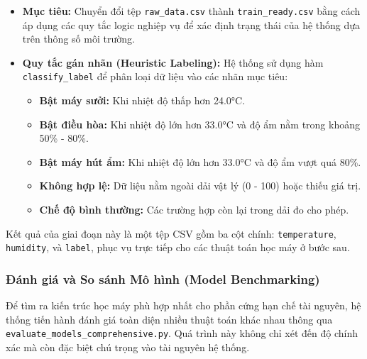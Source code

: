 \begin{itemize}
    \item \textbf{Mục tiêu:} Chuyển đổi tệp \texttt{raw\_data.csv} thành \texttt{train\_ready.csv} bằng cách áp dụng các quy tắc logic nghiệp vụ để xác định trạng thái của hệ thống dựa trên thông số môi trường.
    \item \textbf{Quy tắc gán nhãn (Heuristic Labeling):} Hệ thống sử dụng hàm \texttt{classify\_label} để phân loại dữ liệu vào các nhãn mục tiêu:
    \begin{itemize}
        \item \textbf{Bật máy sưởi:} Khi nhiệt độ thấp hơn 24.0°C.
        \item \textbf{Bật điều hòa:} Khi nhiệt độ lớn hơn 33.0°C và độ ẩm nằm trong khoảng 50\% - 80\%.
        \item \textbf{Bật máy hút ẩm:} Khi nhiệt độ lớn hơn 33.0°C và độ ẩm vượt quá 80\%.
        \item \textbf{Không hợp lệ:} Dữ liệu nằm ngoài dải vật lý (0 - 100) hoặc thiếu giá trị.
        \item \textbf{Chế độ bình thường:} Các trường hợp còn lại trong dải đo cho phép.
    \end{itemize}
    
\end{itemize}



Kết quả của giai đoạn này là một tệp CSV gồm ba cột chính: \texttt{temperature}, \texttt{humidity}, và \texttt{label}, phục vụ trực tiếp cho các thuật toán học máy ở bước sau.

\subsubsection{Đánh giá và So sánh Mô hình (Model Benchmarking)}

Để tìm ra kiến trúc học máy phù hợp nhất cho phần cứng hạn chế tài nguyên, hệ thống tiến hành đánh giá toàn diện nhiều thuật toán khác nhau thông qua \texttt{evaluate\_models\_comprehensive.py}. Quá trình này không chỉ xét đến độ chính xác mà còn đặc biệt chú trọng vào tài nguyên hệ thống.

